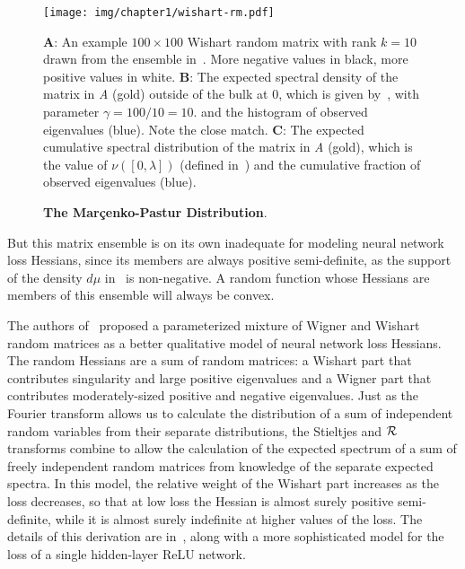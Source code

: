 \documentclass[../../thesis.tex]{subfiles}
\begin{document}
\begin{figure}[ht]
	\begin{center}
		\texttt{[image: img/chapter1/wishart-rm.pdf]}
	\end{center}
	\caption{\textbf{The Mar{\c c}enko-Pastur Distribution}.}%
	{\textbf{A}: An example $100\times100$ Wishart random matrix with rank $k=10$
		drawn from the ensemble in~.
		More negative values in black, more positive values in white.
	\textbf{B}: The expected spectral density of the matrix in \emph{A} (gold)
		outside of the bulk at $0$,
		which is given by~,
		with parameter $\gamma=100/10=10$.
		and the histogram of observed eigenvalues (blue). Note the close match.
	\textbf{C}: The expected cumulative spectral distribution
		of the matrix in \emph{A} (gold),
		which is the value of $\nu\left(\left[0, \lambda\right]\right)$
		(defined in~)
		and the cumulative fraction of observed eigenvalues (blue).}
\end{figure}

But this matrix ensemble is on its own inadequate
for modeling neural network loss Hessians,
since its members are always positive semi-definite,
as the support of the density $d\mu$
in~ is non-negative.
A random function whose Hessians are members of this ensemble
will always be convex.

The authors of~\cite{pennington2017}
proposed a parameterized mixture of Wigner and Wishart random matrices
as a better qualitative model of neural network loss Hessians.
The random Hessians are a sum of random matrices:
a Wishart part that contributes singularity
and large positive eigenvalues
and a Wigner part that contributes
moderately-sized positive and negative eigenvalues.
Just as the Fourier transform allows us to calculate
the distribution of a sum of independent random variables
from their separate distributions,
the Stieltjes and ${\mathcal{R}}$ transforms combine
to allow the calculation of the expected spectrum of a sum of
freely independent random matrices from knowledge of the separate expected spectra.
In this model, the relative weight of the Wishart part
increases as the loss decreases,
so that at low loss the Hessian is almost surely positive semi-definite,
while it is almost surely indefinite at higher values of the loss.
The details of this derivation are in~\cite{pennington2017},
along with a more sophisticated model
for the loss of a single hidden-layer ReLU network.
\end{document}
